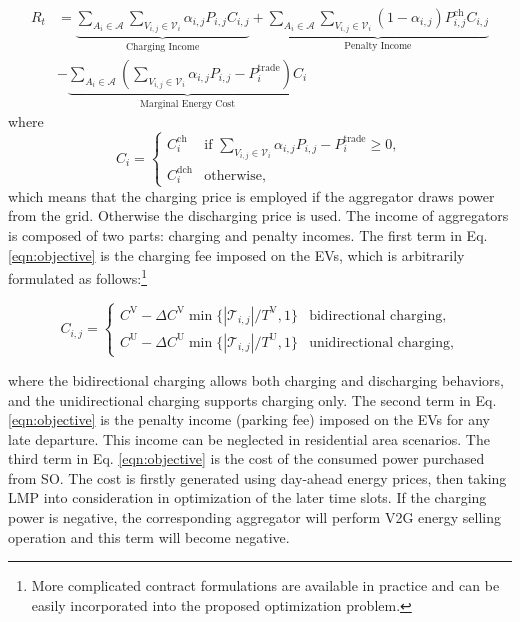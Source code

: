 \documentclass[conference]{IEEEtran}
\begin{document}
    \vspace{-0.5cm}
	{\small
    \begin{align}\label{eqn:objective}
R_t & = \underbrace{\sum_{A_i\in\mathcal{A}}\sum_{V_{i,j}\in\mathcal{V}_i}\alpha_{i,j}P_{i,j} C_{i,j}}_{\text{Charging Income}} + \underbrace{\sum_{A_i\in\mathcal{A}}\sum_{V_{i,j}\in\mathcal{V}_i}(1 - \alpha_{i,j})P^\text{ch}_{i,j}C_{i,j}}_{\text{Penalty Income}} \nonumber \\
		& - \underbrace{\sum_{A_i\in\mathcal{A}}(\sum_{V_{i,j}\in\mathcal{V}_i}\alpha_{i,j}P_{i,j} - P^\text{trade}_i)C_i}_{\text{Marginal Energy Cost}} \end{align}}where
\begin{equation}
	C_i = 	
	\begin{cases}
	C_i^\text{ch}  & \text{if } \sum_{V_{i,j}\in\mathcal{V}_i}\alpha_{i,j}P_{i,j} - P^\text{trade}_i \geq 0,\\
	C_i^\text{dch} & \text{otherwise},
	\end{cases}
\end{equation}
which means that the charging price is employed if the aggregator draws power from the grid. Otherwise the discharging price is used. The income of aggregators is composed of two parts: charging and penalty incomes. The first term in Eq. \eqref{eqn:objective} is the charging fee imposed on the EVs, which is arbitrarily formulated as follows:\footnote{More complicated contract formulations are available in practice and can be easily incorporated into the proposed optimization problem.}

\vspace{-0.4cm}
{\small
\begin{equation}\label{eqn:chargingfee}
		C_{i,j} = 	
		\begin{cases}
		C^\text{V} - \Delta C^\text{V} \min\{|\mathcal{T}_{i,j}|/T^\text{V},1\} & \text{bidirectional charging},\\
		C^\text{U} - \Delta C^\text{U} \min\{|\mathcal{T}_{i,j}|/T^\text{U},1\} & \text{unidirectional charging},
		\end{cases}
\end{equation}}

\vspace{-0.4cm}
\noindent where the bidirectional charging allows both charging and discharging behaviors, and the unidirectional charging supports charging only. The second term in Eq. \eqref{eqn:objective} is the penalty income (parking fee) imposed on the EVs for any late departure. This income can be neglected in residential area scenarios. The third term in Eq. \eqref{eqn:objective} is the cost of the consumed power purchased from SO. The cost is firstly generated using day-ahead energy prices, then taking LMP into consideration in optimization of the later time slots. If the charging power is negative, the corresponding aggregator will perform V2G energy selling operation and this term will become negative.
	
\end{document}
